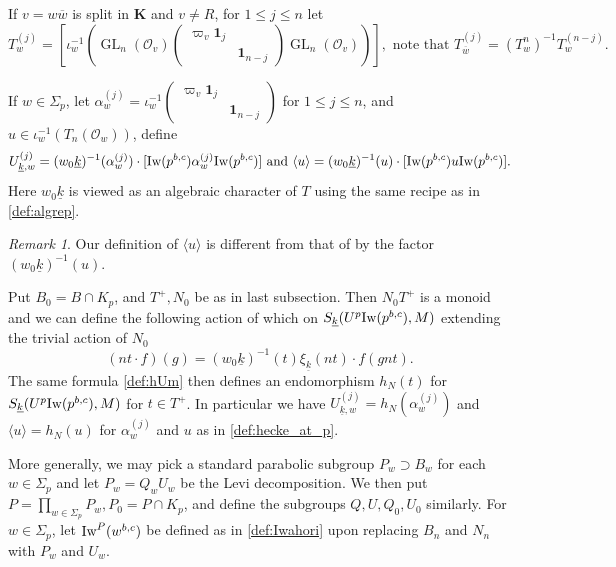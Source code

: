 \documentclass[leqno]{amsart}
\theoremstyle{definition}
\theoremstyle{remark}
\newtheorem{rem}[thm]{Remark}
\newcommand{\id}{\mathbf{1}}
\newcommand{\oo}{\mathcal{O}}
\DeclareMathOperator{\GL}{GL}
\newcommand{\K}{{\mathbf{K}}} %
\newcommand{\bw}{\overline{w}}
\newcommand{\wt}[1]{\underline{ #1 }}
\newcommand{\Iw}{\textnormal{Iw}} %
\begin{document}
If $v=w\bw$ is split in  $\K$ and $v\neq R$,
for $1\leq j\leq n$ let 
\begin{equation}\label{def:hecke_away_p}
	T_w^{(j)}=
	\left[\iota_w^{-1}\left(
	\GL_n(\oo_v)
	\begin{pmatrix}
		\varpi_v\id_{j}&\\&\id_{n-j}
	\end{pmatrix}
	\GL_n(\oo_v)
	\right)\right],
	\text{ note that }
	T_{\bw}^{(j)}=(T_{w}^{{n}})^{-1}T_w^{(n-j)}.
\end{equation}

If $w\in \Sigma_p$, let  
$\alpha_w^{(j)}=\iota_w^{-1}
\left(\begin{smallmatrix}
\varpi_v\id_{j}&\\&\id_{n-j} 
\end{smallmatrix}\right)$ for $1\leq j\leq n$,
and $u\in \iota_w^{-1}(T_n(\oo_w))$, define
\begin{equation}\label{def:hecke_at_p}
	U_{\wt{k},w}^{(j)}=
	(w_0\wt{k})^{-1}(\alpha_{w}^{(j)})\cdot
	[\Iw(p^{b,c})\alpha_w^{(j)}\Iw(p^{b,c})]
	\text{ and }
	\langle u\rangle= (w_0\wt{k})^{-1}(u)\cdot 
	[\Iw(p^{b,c})u\Iw(p^{b,c})].
\end{equation}
Here $w_0\wt{k}$ is viewed as an algebraic character of $T$ 
using the same recipe as in \eqref{def:algrep}.
\begin{rem}
	Our definition of $\langle u\rangle$
	is different from that of \cite{ger}
	by the factor $(w_0\wt{k})^{-1}(u)$.
\end{rem}
Put $B_0=B\cap K_p$,
and $T^+, N_0$ be as in last subsection.
Then $N_0T^+$ is a monoid
and we can define the following action of which
on  $S_{\wt{k}}(U^p\Iw(p^{b,c}),M)$
extending the trivial action of $N_0$
\begin{equation}\label{def:T_act}
	(nt\cdot f)(g)=(w_0\wt{k})^{-1}(t)\xi_{\wt{k}}(nt)\cdot f(gnt).
\end{equation}
The same formula \eqref{def:hUm}
then defines an endomorphism $h_N(t)$
for $S_{\wt{k}}(U^p\Iw(p^{b,c}),M)$
for $t\in T^+$.
In particular we have
$U_{\wt{k},w}^{(j)}=h_N(\alpha_{w}^{(j)})$ and $\langle u\rangle= h_N(u)$
for $\alpha_w^{(j)}$ and $u$ as in \eqref{def:hecke_at_p}. 


More generally, 
we may pick a standard parabolic subgroup
$P_w\supset B_w$ for each  $w\in \Sigma_p$
and let  $P_w=Q_wU_w$ be the Levi decomposition.
We then put $P=\prod_{w\in \Sigma_p}P_w, P_0=P\cap K_p$,
and define the subgroups $Q,U, Q_0, U_0$ similarly.
For $w\in \Sigma_p$,
let  $\Iw^P(w^{b,c})$ 
be defined as in \eqref{def:Iwahori}
upon replacing $B_n$ and $N_n$
with $P_w$ and  $U_w$.
\end{document}
